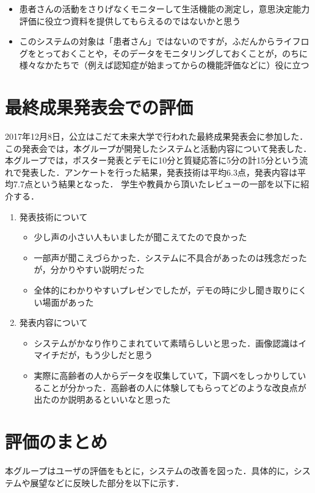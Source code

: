 \documentclass[../report]{subfiles}
\begin{document}
\begin{itemize}
    \item 患者さんの活動をさりげなくモニターして生活機能の測定し，意思決定能力評価に役立つ資料を提供してもらえるのではないかと思う
    \item このシステムの対象は「患者さん」ではないのですが，ふだんからライフログをとっておくことや，そのデータをモニタリングしておくことが，のちに様々なかたちで（例えば認知症が始まってからの機能評価などに）役に立つ
\end{itemize}

\section{最終成果発表会での評価}
2017年12月8日，公立はこだて未来大学で行われた最終成果発表会に参加した．
この発表会では，本グループが開発したシステムと活動内容について発表した．
本グループでは，ポスター発表とデモに10分と質疑応答に5分の計15分という流れで発表した．アンケートを行った結果，発表技術は平均6.3点，発表内容は平均7.7点という結果となった．
学生や教員から頂いたレビューの一部を以下に紹介する．

\begin{enumerate}
    \item[] 発表技術について
    \begin{itemize}
        \item 少し声の小さい人もいましたが聞こえてたので良かった
        \item 一部声が聞こえづらかった．システムに不具合があったのは残念だったが，分かりやすい説明だった
        \item 全体的にわかりやすいプレゼンでしたが，デモの時に少し聞き取りにくい場面があった
    \end{itemize}

    \item[] 発表内容について
    \begin{itemize}
        \item システムがかなり作りこまれていて素晴らしいと思った．画像認識はイマイチだが，もう少しだと思う
        \item 実際に高齢者の人からデータを収集していて，下調べをしっかりしていることが分かった．高齢者の人に体験してもらってどのような改良点が出たのか説明あるといいなと思った
    \end{itemize}
\end{enumerate}


\section{評価のまとめ}
本グループはユーザの評価をもとに，システムの改善を図った．具体的に，システムや展望などに反映した部分を以下に示す．
\end{document}
